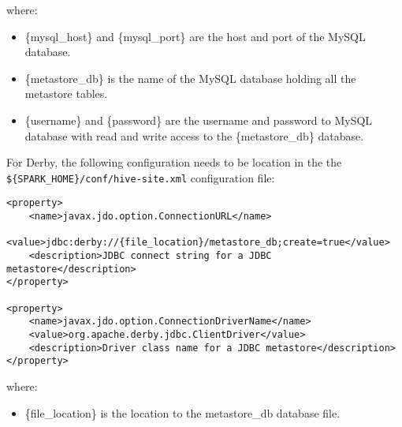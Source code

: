where:
\begin{itemize}
\item \{mysql\_host\} and \{mysql\_port\} are the host and port of the MySQL database.
\item \{metastore\_db\} is the name of the MySQL database holding all the metastore tables.
\item \{username\} and \{password\} are the username and password to MySQL database with read and write access to the \{metastore\_db\} database.
\end{itemize}

For Derby, the following configuration needs to be location in the the {\lstinline[style=Bash]|${SPARK_HOME}/conf/hive-site.xml|} configuration file:

\begin{lstlisting}[style=Bash]
<property>
    <name>javax.jdo.option.ConnectionURL</name>
    <value>jdbc:derby://{file_location}/metastore_db;create=true</value>
    <description>JDBC connect string for a JDBC metastore</description>
</property>

<property>
    <name>javax.jdo.option.ConnectionDriverName</name>
    <value>org.apache.derby.jdbc.ClientDriver</value>
    <description>Driver class name for a JDBC metastore</description>
</property>
\end{lstlisting}

where:
\begin{itemize}
\item \{file\_location\} is the location to the metastore\_db database file.
\end{itemize}